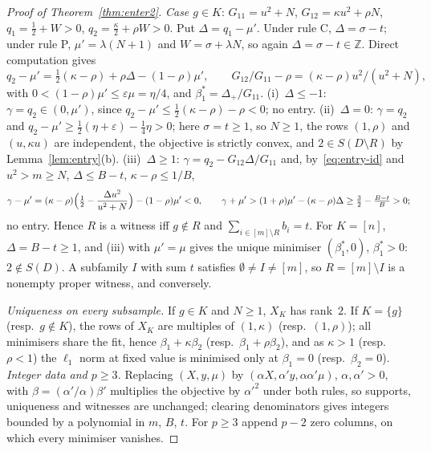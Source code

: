 \documentclass[10pt,a4paper]{article}
\theoremstyle{plain}
\theoremstyle{definition}
\theoremstyle{remark}
\newcommand{\Dm}{D\setminus R}
\begin{document}
\begin{proof}[Proof of Theorem~\ref{thm:enter2}]
\emph{Case $g\in K$}: $G_{11}=u^2+N$, $G_{12}=\kappa u^2+\rho N$, $q_1=\frac12+W>0$, $q_2=\frac{\kappa}{2}+\rho W>0$. Put $\Delta=q_1-\mu'$. Under rule C, $\Delta=\sigma-t$; under rule P, $\mu'=\lambda(N+1)$ and $W=\sigma+\lambda N$, so again $\Delta=\sigma-t\in\mathbb Z$. Direct computation gives
\begin{equation}\label{eq:entry-id}
q_2-\mu'=\tfrac12(\kappa-\rho)+\rho\Delta-(1-\rho)\mu',\qquad G_{12}/G_{11}-\rho=(\kappa-\rho)u^2/(u^2+N),
\end{equation}
with $0<(1-\rho)\mu'\le\varepsilon\mu=\eta/4$, and $\beta_1^\ast=\Delta_+/G_{11}$. (i)~$\Delta\le-1$: $\gamma=q_2\in(0,\mu')$, since $q_2-\mu'\le\frac12(\kappa-\rho)-\rho<0$; no entry. (ii)~$\Delta=0$: $\gamma=q_2$ and $q_2-\mu'\ge\frac12(\eta+\varepsilon)-\frac14\eta>0$; here $\sigma=t\ge1$, so $N\ge1$, the rows $(1,\rho)$ and $(u,\kappa u)$ are independent, the objective is strictly convex, and $2\in S(\Dm)$ by Lemma~\ref{lem:entry}(b). (iii)~$\Delta\ge1$: $\gamma=q_2-G_{12}\Delta/G_{11}$ and, by~\eqref{eq:entry-id} and $u^2>m\ge N$, $\Delta\le B-t$, $\kappa-\rho\le1/B$,
\[
\gamma-\mu'=(\kappa-\rho)\Bigl(\tfrac12-\frac{\Delta u^2}{u^2+N}\Bigr)-(1-\rho)\mu'<0,\qquad
\gamma+\mu'>(1+\rho)\mu'-(\kappa-\rho)\Delta\ge\tfrac32-\tfrac{B-t}{B}>0 ;
\]
no entry. Hence $R$ is a witness iff $g\notin R$ and $\sum_{i\in[m]\setminus R}b_i=t$. For $K=[n]$, $\Delta=B-t\ge1$, and (iii) with $\mu'=\mu$ gives the unique minimiser $(\beta_1^\ast,0)$, $\beta_1^\ast>0$: $2\notin S(D)$. A subfamily $I$ with sum $t$ satisfies $\emptyset\neq I\neq[m]$, so $R=[m]\setminus I$ is a nonempty proper witness, and conversely.

\emph{Uniqueness on every subsample.} If $g\in K$ and $N\ge1$, $X_K$ has rank~$2$. If $K=\{g\}$ (resp.\ $g\notin K$), the rows of $X_K$ are multiples of $(1,\kappa)$ (resp.\ $(1,\rho)$); all minimisers share the fit, hence $\beta_1+\kappa\beta_2$ (resp.\ $\beta_1+\rho\beta_2$), and as $\kappa>1$ (resp.\ $\rho<1$) the $\ell_1$ norm at fixed value is minimised only at $\beta_1=0$ (resp.\ $\beta_2=0$). \emph{Integer data and $p\ge3$.} Replacing $(X,y,\mu)$ by $(\alpha X,\alpha'y,\alpha\alpha'\mu)$, $\alpha,\alpha'>0$, with $\beta=(\alpha'/\alpha)\beta'$ multiplies the objective by $\alpha'^2$ under both rules, so supports, uniqueness and witnesses are unchanged; clearing denominators gives integers bounded by a polynomial in $m$, $B$, $t$. For $p\ge3$ append $p-2$ zero columns, on which every minimiser vanishes.
\end{proof}
\end{document}
